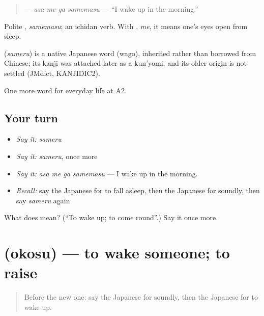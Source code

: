 \begin{quote}
\textbf{  } — \emph{asa me ga samemasu} — \textquotedblleft{}I wake up in the morning.\textquotedblright{}
\end{quote}

Polite \textbf{}, \emph{samemasu}; an ichidan verb. With \textbf{}, \emph{me}, it means one's eyes open from sleep.

\begin{cousinweb}
\textbf{} (\emph{sameru}) is a native Japanese word (wago), inherited rather than borrowed from Chinese; its kanji was attached later as a kun'yomi, and its older origin is not settled (JMdict, KANJIDIC2).
\end{cousinweb}

\begin{grammarlens}[title={What you've built}]
One more word for everyday life at A2.
\end{grammarlens}

\subsection*{Your turn}
\begin{itemize}
\raggedright
  \item \emph{Say it:} \emph{sameru}
  \item \emph{Say it:} \emph{sameru}, once more
  \item \emph{Say it:} \emph{asa me ga samemasu} — I wake up in the morning.
  \item \emph{Recall:} say the Japanese for to fall asleep, then the Japanese for soundly, then say \emph{sameru} again
\end{itemize}

\begin{tcolorbox}[breakable,colback=teal!4,colframe=teal!35!black,title={Before you move on}]
What does  mean? (\textquotedblleft{}To wake up; to come round\textquotedblright{}.) Say it once more.
\end{tcolorbox}
\section[\texorpdfstring{\ja{おこす} (okosu)}{おこす (okosu)}]{ (okosu) — to wake someone; to raise}

\label{lesson:JA-C146-okosu}



\begin{quote}
Before the new one: say the Japanese for soundly, then the Japanese for to wake up.
\end{quote}

